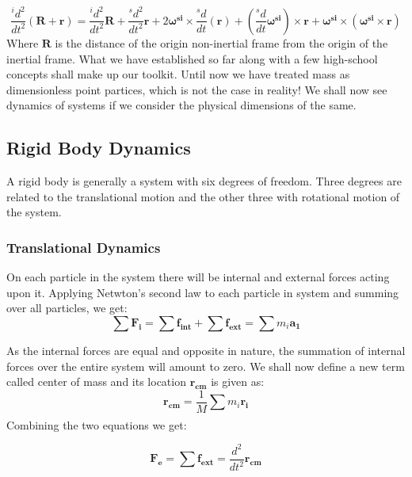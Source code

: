 \documentclass[12pt, letterpaper]{article}
\begin{document}
\begin{displaymath}
\frac{{}^id^2}{dt^2}(\mathbf{R + r}) = \frac{{}^id^2}{dt^2}\mathbf{R} + \frac{{}^sd^2}{dt^2}\mathbf{r} + 2\mathbf{\omega^{si}}\times\frac{{}^sd}{dt}(\textbf{r}) + (\frac{{}^sd}{dt}\mathbf{\omega^{si}})\times\mathbf{r} + \mathbf{\omega^{si}}\times(\mathbf{\omega^{si}}\times\mathbf{r})
\end{displaymath}
Where $\mathbf{R}$ is the distance of the origin non-inertial frame from the origin of the inertial frame. What we have established so far along with a few high-school concepts shall make up our toolkit. Until now we have treated mass as dimensionless point partices, which is not the case in reality! We shall now see dynamics of systems if we consider the physical dimensions of the same.

\subsection{Rigid Body Dynamics}

A rigid body is generally a system with six degrees of freedom. Three degrees are related to the translational motion and the other three with rotational motion of the system. 

\subsubsection{Translational Dynamics}

On each particle in the system there will be internal and external forces acting upon it. Applying Netwton's second law to each particle in system and summing over all particles, we get:
\begin{displaymath}
\sum \mathbf{F_i} = \sum \mathbf{f_{int}} + \sum \mathbf{f_{ext}} = \sum m_i\mathbf{a_1}
\end{displaymath}


As the internal forces are equal and opposite in nature, the summation of internal forces over the entire system will amount to zero. We shall now define a new term called center of mass and its location $\mathbf{r_{cm}}$ is given as:
\begin{displaymath}
\mathbf{r_{cm}} = \frac{1}{M}\sum_{}^{} m_{i} \mathbf{r_{i}}
\end{displaymath}
 Combining the two equations we get:

 \begin{displaymath}
 \mathbf{F_e} = \sum \mathbf{f_{ext}} = \frac{d^2}{dt^2}\mathbf{r_{cm}}
 \end{displaymath}
\end{document}
